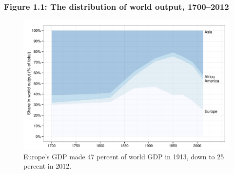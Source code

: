 \documentclass[t]{beamer}\usepackage[]{graphicx}\usepackage[]{color}
\newenvironment{knitrout}{}{} %
\begin{document}
\begin{frame}[label=Figure_1_1]
\frametitle{Figure 1.1: The distribution of world output, 1700--2012}
\begin{figure}[t]
\begin{minipage}[b]{\textwidth}
\centering
\begin{knitrout}\footnotesize
{}\color{fgcolor}

{\centering \includegraphics[width=1\linewidth]{figures/color/Figure_1_1} 

}



\end{knitrout}
\caption{Europe's GDP made 47 percent of world GDP in 1913, down to 25 percent in 2012.}
\end{minipage}
\end{figure}
\end{frame}
\end{document}
